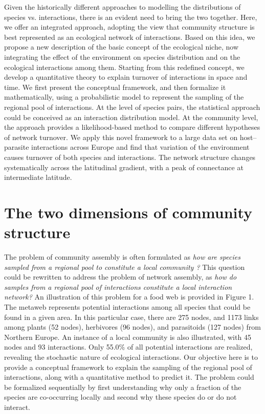 \documentclass[12pt]{article}
\begin{document}
Given the historically different approaches to modelling the distributions of
species vs. interactions, there is an evident need to bring the two together.
Here, we offer an integrated approach, adopting the view that community
structure is best represented as an ecological network of interactions. Based
on this idea, we propose a new description of the basic concept of the
ecological niche, now integrating the effect of the environment on species
distribution and on the ecological interactions among them. Starting from this
redefined concept, we develop a quantitative theory to explain turnover of
interactions in space and time. We first present the conceptual framework, and
then formalize it mathematically, using a probabilistic model to represent the
sampling of the regional pool of interactions. At the level of species pairs,
the statistical approach could be conceived as an interaction distribution
model. At the community level, the approach provides a likelihood-based method
to compare different hypotheses of network turnover. We apply this novel
framework to a large data set on host–parasite interactions across Europe and
find that variation of the environment causes turnover of both species and
interactions. The network structure changes systematically across the
latitudinal gradient, with a peak of connectance at intermediate latitude.

\section*{The two dimensions of community structure}

The problem of community assembly is often formulated as \textit{how are
species sampled from a regional pool to constitute a local community
\citep{Gotzenberger2012}?} This question could be rewritten to address the
problem of network assembly, as \textit{how do samples from a regional pool of
interactions constitute a local interaction network?} An illustration of this
problem for a food web is provided in Figure 1. The metaweb represents
potential interactions among all species that could be found in a given area.
In this particular case, there are 275 nodes, and 1173 links among plants (52
nodes), herbivores (96 nodes), and parasitoids (127 nodes) from Northern
Europe. An instance of a local community is also illustrated, with 45 nodes
and 93 interactions. Only 55.0\% of all potential interactions are realized,
revealing the stochastic nature of ecological interactions. Our objective here
is to provide a conceptual framework to explain the sampling of the regional
pool of interactions, along with a quantitative method to predict it. The
problem could be formalized sequentially by first understanding why only a
fraction of the species are co-occurring locally and second why these species
do or do not interact.
\end{document}
